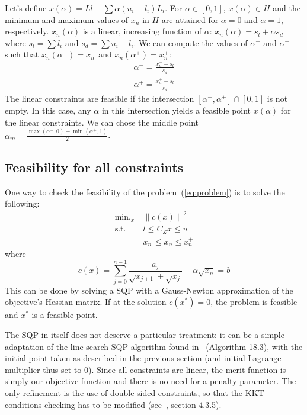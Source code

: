 \documentclass[]{article}
\DeclareMathOperator*{\minimize}{\min.}
\newcommand{\st}{\mbox{s.t.}}
\begin{document}
Let's define $x(\alpha) = Ll + \sum \alpha (u_i-l_i) L_i$. For $\alpha \in \left[0,1\right]$, $x(\alpha) \in H$ and the minimum and maximum values of $x_n$ in $H$ are attained for $\alpha = 0$ and $\alpha = 1$, respectively. $x_n(\alpha)$ is a linear, increasing function of $\alpha$: $x_n(\alpha) = s_l + \alpha s_d$ where $s_l = \sum l_i$ and $s_d = \sum u_i-l_i$. \newline
We can compute the values of $\alpha^-$ and $\alpha^+$ such that $x_n(\alpha^-) = x_n^-$ and $x_n(\alpha^+) = x_n^+$:
\begin{align}
 \alpha^- = \frac{x_n^- - s_l}{s_d} \\
 \alpha^+ = \frac{x_n^+ - s_l}{s_d}
\end{align}
The linear constraints are feasible if the intersection $\left[\alpha^-, \alpha^+\right] \cap \left[0,1\right]$ is not empty. In this case, any $\alpha$ in this intersection yields a feasible point $x(\alpha)$ for the linear constraints. We can chose the middle point $\alpha_m = \frac{\max(\alpha^-,0) + \min(\alpha^+,1)}{2}$.

\subsection{Feasibility for all constraints}
One way to check the feasibility of the problem~(\ref{eq:problem}) is to solve the following:
\begin{align}
  \minimize_x\ & \left\|c(x)\right\|^2 \\
  \st\ & l \leq C_Z x \leq u\\
       & x_n^- \leq x_n \leq x_n^+
\end{align}
where
\begin{equation}
  c(x) = \sum_{j=0}^{n-1} \frac{a_j}{\sqrt{x_{j+1}} + \sqrt{x_j}} - \alpha \sqrt{x_n} = b
\end{equation}
This can be done by solving a SQP with a Gauss-Newton approximation of the objective's Hessian matrix. If at the solution $c(x^*) = 0$, the problem is feasible and $x^*$ is a feasible point.

The SQP in itself does not deserve a particular treatment: it can be a simple adaptation of the line-search SQP algorithm found in~\cite{nocedal:book:2006} (Algorithm 18.3), with the initial point taken as described in the previous section (and initial Lagrange multiplier thus set to $0$). Since all constraints are linear, the merit function is simply our objective function and there is no need for a penalty parameter. The only refinement is the use of double sided constraints, so that the KKT conditions checking has to be modified (see~\cite{brossette:phd:2016}, section 4.3.5).
\end{document}
